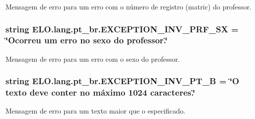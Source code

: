 Mensagem de erro para um erro com o número de registro (matric) do professor. 

\hypertarget{namespaceELO_1_1lang_1_1pt__br_adb286bfeeed3ed5c7e8c5cccd5238267}{
\subsubsection[{E\-X\-C\-E\-P\-T\-I\-O\-N\-\_\-\-I\-N\-V\-\_\-\-P\-R\-F\-\_\-\-S\-X}]{\setlength{\rightskip}{0pt plus 5cm}string E\-L\-O.\-lang.\-pt\-\_\-br.\-E\-X\-C\-E\-P\-T\-I\-O\-N\-\_\-\-I\-N\-V\-\_\-\-P\-R\-F\-\_\-\-S\-X = \char`\"{}Ocorreu um erro no sexo do professor.\char`\"{}}}\label{d5/d70/namespaceELO_1_1lang_1_1pt__br_adb286bfeeed3ed5c7e8c5cccd5238267}


Mensagem de erro para um erro com o sexo do professor. 

\hypertarget{namespaceELO_1_1lang_1_1pt__br_a8be4b8c08c31de303a7e16ccc9c012b9}{
\subsubsection[{E\-X\-C\-E\-P\-T\-I\-O\-N\-\_\-\-I\-N\-V\-\_\-\-P\-T\-\_\-\-B}]{\setlength{\rightskip}{0pt plus 5cm}string E\-L\-O.\-lang.\-pt\-\_\-br.\-E\-X\-C\-E\-P\-T\-I\-O\-N\-\_\-\-I\-N\-V\-\_\-\-P\-T\-\_\-\-B = \char`\"{}O texto deve conter no máximo 1024 caracteres.\char`\"{}}}\label{d5/d70/namespaceELO_1_1lang_1_1pt__br_a8be4b8c08c31de303a7e16ccc9c012b9}


Mensagem de erro para um texto maior que o especificado. 

